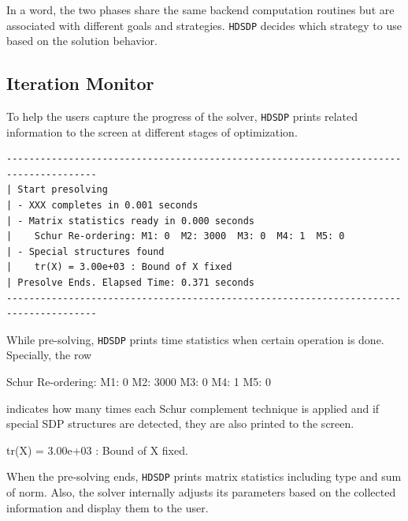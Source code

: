 In a word, the two phases share the same backend computation routines but are
associated with different goals and strategies. {{\texttt{HDSDP}}} decides
which strategy to use based on the solution behavior.

\subsection{Iteration Monitor}

To help the users capture the progress of the solver, {{\texttt{HDSDP}}}
prints related information to the screen at different stages of optimization. 
\begin{lstlisting}
--------------------------------------------------------------------------------------
| Start presolving 
| - XXX completes in 0.001 seconds 
| - Matrix statistics ready in 0.000 seconds 
|    Schur Re-ordering: M1: 0  M2: 3000  M3: 0  M4: 1  M5: 0 
| - Special structures found 
|    tr(X) = 3.00e+03 : Bound of X fixed 
| Presolve Ends. Elapsed Time: 0.371 seconds 
--------------------------------------------------------------------------------------
\end{lstlisting}
While pre-solving, {{\texttt{HDSDP}}} prints time statistics when certain operation
is done. Specially, the row
\begin{tmcode}
      Schur Re-ordering: M1: 0  M2: 3000  M3: 0  M4: 1  M5: 0
\end{tmcode}
indicates how many times each Schur complement technique is applied and if
special SDP structures are detected, they are also printed to the screen.
\begin{tmcode}
      tr(X) = 3.00e+03 : Bound of X fixed.
\end{tmcode}
When the pre-solving ends, {{\texttt{HDSDP}}} prints matrix statistics
including type and sum of norm. Also, the solver internally adjusts its parameters
based on the collected information and display them to the user. 

